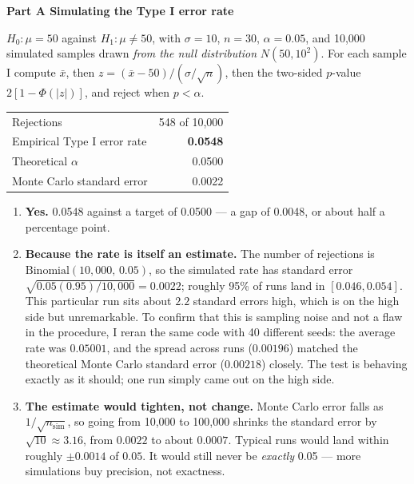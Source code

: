 \documentclass[11pt]{article}
\begin{document}
\noindent\textbf{Part A \quad Simulating the Type I error rate}

\smallskip
\noindent $H_0:\mu=50$ against $H_1:\mu\neq50$, with $\sigma=10$, $n=30$, $\alpha=0.05$, and 10,000
simulated samples drawn \emph{from the null distribution} $N(50,10^2)$. For each sample I compute
$\bar x$, then $z=(\bar x-50)/(\sigma/\sqrt n)$, then the two-sided $p$-value $2[1-\Phi(|z|)]$, and
reject when $p<\alpha$.

\begin{center}\small
\begin{tabular}{lr}
\toprule
Rejections & 548 of 10,000\\
Empirical Type I error rate & \textbf{0.0548}\\
Theoretical $\alpha$ & 0.0500\\
Monte Carlo standard error & 0.0022\\
\bottomrule
\end{tabular}
\end{center}

\begin{enumerate}[label=\textbf{(\alph*)},leftmargin=*,itemsep=4pt]
\item \textbf{Yes.} 0.0548 against a target of 0.0500 --- a gap of 0.0048, or about half a
percentage point.

\item \textbf{Because the rate is itself an estimate.} The number of rejections is
$\text{Binomial}(10{,}000,\,0.05)$, so the simulated rate has standard error
$\sqrt{0.05(0.95)/10{,}000}=0.0022$; roughly 95\% of runs land in $[0.046,0.054]$. This particular
run sits about $2.2$ standard errors high, which is on the high side but unremarkable. To confirm
that this is sampling noise and not a flaw in the procedure, I reran the same code with 40
different seeds: the average rate was $0.05001$, and the spread across runs ($0.00196$) matched the
theoretical Monte Carlo standard error ($0.00218$) closely. The test is behaving exactly as it
should; one run simply came out on the high side.

\item \textbf{The estimate would tighten, not change.} Monte Carlo error falls as
$1/\sqrt{n_{\text{sim}}}$, so going from 10,000 to 100,000 shrinks the standard error by
$\sqrt{10}\approx3.16$, from $0.0022$ to about $0.0007$. Typical runs would land within roughly
$\pm0.0014$ of $0.05$. It would still never be \emph{exactly} 0.05 --- more simulations buy
precision, not exactness.
\end{enumerate}
\end{document}
